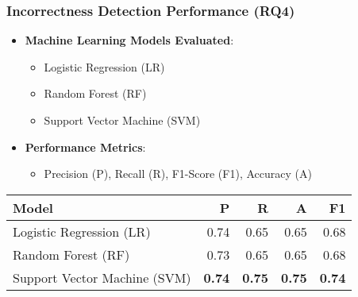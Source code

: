 \begin{frame}
  \frametitle{Incorrectness Detection Performance (RQ4)}
  \begin{itemize}
    \item \textbf{Machine Learning Models Evaluated}:
    \begin{itemize}
      \item Logistic Regression (LR)
      \item Random Forest (RF)
      \item Support Vector Machine (SVM)
    \end{itemize}
    \item \textbf{Performance Metrics}:
    \begin{itemize}
      \item Precision (P), Recall (R), F1-Score (F1), Accuracy (A)
    \end{itemize}
  \end{itemize}
  \begin{center}
    \small
    \begin{tabular}{lrrrr}
    \toprule
     \textbf{Model} & \textbf{P} & \textbf{R} & \textbf{A} & \textbf{F1} \\ \midrule
    Logistic Regression (LR) & 0.74 & 0.65 & 0.65 & 0.68 \\ 
    Random Forest (RF) & 0.73 & 0.65 & 0.65 & 0.68 \\ 
    Support Vector Machine (SVM) & \textbf{0.74} & \textbf{0.75} & \textbf{0.75} & \textbf{0.74} \\ 
    \bottomrule
    \end{tabular}
    \label{tab:model_accuracy}
  \end{center}
\end{frame}


